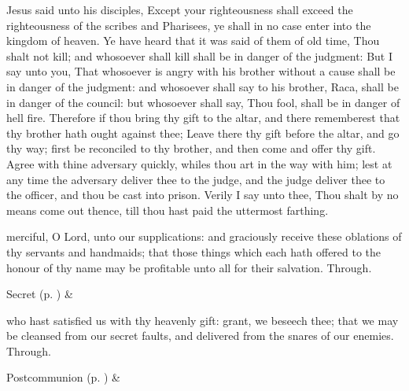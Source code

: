 
 Jesus said unto his disciples, Except your righteousness shall exceed the righteousness of the scribes and Pharisees, ye shall in no case enter into the kingdom of heaven. Ye have heard that it was said of them of old time, Thou shalt not kill; and whosoever shall kill shall be in danger of the judgment: But I say unto you, That whosoever is angry with his brother without a cause shall be in danger of the judgment: and whosoever shall say to his brother, Raca, shall be in danger of the council: but whosoever shall say, Thou fool, shall be in danger of hell fire. Therefore if thou bring thy gift to the altar, and there rememberest that thy brother hath ought against thee; Leave there thy gift before the altar, and go thy way; first be reconciled to thy brother, and then come and offer thy gift. Agree with thine adversary quickly, whiles thou art in the way with him; lest at any time the adversary deliver thee to the judge, and the judge deliver thee to the officer, and thou be cast into prison. Verily I say unto thee, Thou shalt by no means come out thence, till thou hast paid the uttermost farthing.


\secret
{} merciful, O Lord, unto our supplications: and graciously receive these oblations of thy servants and handmaids; that those things which each hath offered to the honour of thy name may be profitable unto all for their salvation. Through.
\begin{rubric}
     Secret  (p. \pageref{SPSaints}) \&  
\end{rubric}


\postcommunion
{} who hast satisfied us with thy heavenly gift: grant, we beseech thee; that we may be cleansed from our secret faults, and delivered from the snares of our enemies. Through.
\begin{rubric}
     Postcommunion  (p. \pageref{SPSaints}) \&  
\end{rubric}


